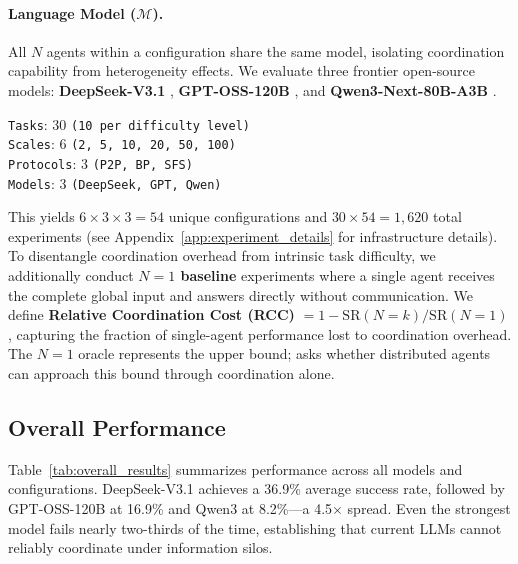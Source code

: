 \paragraph{Language Model ($\mathcal{M}$).}
All $N$ agents within a configuration share the same model, isolating coordination capability from heterogeneity effects. 
We evaluate three frontier open-source models: \textbf{DeepSeek-V3.1} \citep{liu2024deepseek}, \textbf{GPT-OSS-120B} \citep{openai2025gptoss120bgptoss20bmodel}, and \textbf{Qwen3-Next-80B-A3B} \citep{yang2025qwen3technicalreport}.

\begin{tcolorbox}[colback=lightyellow!10, colframe=black!50, title=Our Experimental Setup]
\texttt{Tasks}: 30 \texttt{(10 per difficulty level)}
\\
\texttt{Scales}: 6 \texttt{(2, 5, 10, 20, 50, 100)}
\\
\texttt{Protocols}: 3 \texttt{(P2P, BP, SFS)}
\\
\texttt{Models}: 3 \texttt{(DeepSeek, GPT, Qwen)}
\end{tcolorbox}

This yields $6 \times 3 \times 3 = 54$ unique configurations and $30 \times 54 = 1{,}620$ total experiments (see Appendix~\ref{app:experiment_details} for infrastructure details). 
To disentangle coordination overhead from intrinsic task difficulty, we additionally conduct \textbf{$N{=}1$ baseline} experiments where a single agent receives the complete global input and answers directly without communication. 
We define \textbf{Relative Coordination Cost (RCC)} $= 1 - \text{SR}(N{=}k)/\text{SR}(N{=}1)$, capturing the fraction of single-agent performance lost to coordination overhead. 
The $N{=}1$ oracle represents the upper bound; \silobench{} asks whether distributed agents can approach this bound through coordination alone.

\subsection{Overall Performance}

Table~\ref{tab:overall_results} summarizes performance across all models and configurations. 
DeepSeek-V3.1 achieves a 36.9\% average success rate, followed by GPT-OSS-120B at 16.9\% and Qwen3 at 8.2\%---a 4.5$\times$ spread. 
Even the strongest model fails nearly two-thirds of the time, establishing that current LLMs cannot reliably coordinate under information silos.

